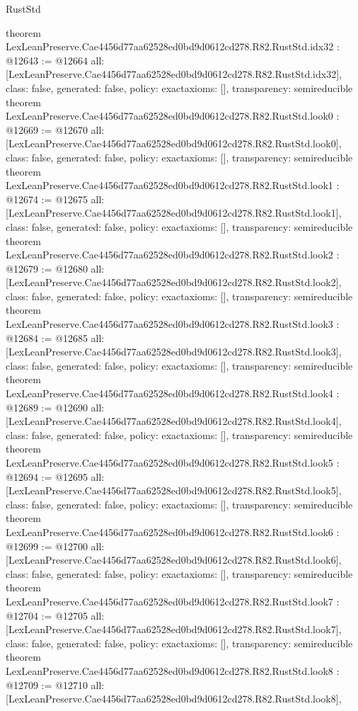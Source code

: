 \begin{lexlean}{RustStd}
\begin{coremodule}
{}
theorem LexLeanPreserve.Cae4456d77aa62528ed0bd9d0612cd278.R82.RustStd.idx32 : @12643 := @12664 {
  all: [LexLeanPreserve.Cae4456d77aa62528ed0bd9d0612cd278.R82.RustStd.idx32],
  class: false,
  generated: false,
  policy: exact{axioms: []},
  transparency: semireducible
}
theorem LexLeanPreserve.Cae4456d77aa62528ed0bd9d0612cd278.R82.RustStd.look0 : @12669 := @12670 {
  all: [LexLeanPreserve.Cae4456d77aa62528ed0bd9d0612cd278.R82.RustStd.look0],
  class: false,
  generated: false,
  policy: exact{axioms: []},
  transparency: semireducible
}
theorem LexLeanPreserve.Cae4456d77aa62528ed0bd9d0612cd278.R82.RustStd.look1 : @12674 := @12675 {
  all: [LexLeanPreserve.Cae4456d77aa62528ed0bd9d0612cd278.R82.RustStd.look1],
  class: false,
  generated: false,
  policy: exact{axioms: []},
  transparency: semireducible
}
theorem LexLeanPreserve.Cae4456d77aa62528ed0bd9d0612cd278.R82.RustStd.look2 : @12679 := @12680 {
  all: [LexLeanPreserve.Cae4456d77aa62528ed0bd9d0612cd278.R82.RustStd.look2],
  class: false,
  generated: false,
  policy: exact{axioms: []},
  transparency: semireducible
}
theorem LexLeanPreserve.Cae4456d77aa62528ed0bd9d0612cd278.R82.RustStd.look3 : @12684 := @12685 {
  all: [LexLeanPreserve.Cae4456d77aa62528ed0bd9d0612cd278.R82.RustStd.look3],
  class: false,
  generated: false,
  policy: exact{axioms: []},
  transparency: semireducible
}
theorem LexLeanPreserve.Cae4456d77aa62528ed0bd9d0612cd278.R82.RustStd.look4 : @12689 := @12690 {
  all: [LexLeanPreserve.Cae4456d77aa62528ed0bd9d0612cd278.R82.RustStd.look4],
  class: false,
  generated: false,
  policy: exact{axioms: []},
  transparency: semireducible
}
theorem LexLeanPreserve.Cae4456d77aa62528ed0bd9d0612cd278.R82.RustStd.look5 : @12694 := @12695 {
  all: [LexLeanPreserve.Cae4456d77aa62528ed0bd9d0612cd278.R82.RustStd.look5],
  class: false,
  generated: false,
  policy: exact{axioms: []},
  transparency: semireducible
}
theorem LexLeanPreserve.Cae4456d77aa62528ed0bd9d0612cd278.R82.RustStd.look6 : @12699 := @12700 {
  all: [LexLeanPreserve.Cae4456d77aa62528ed0bd9d0612cd278.R82.RustStd.look6],
  class: false,
  generated: false,
  policy: exact{axioms: []},
  transparency: semireducible
}
theorem LexLeanPreserve.Cae4456d77aa62528ed0bd9d0612cd278.R82.RustStd.look7 : @12704 := @12705 {
  all: [LexLeanPreserve.Cae4456d77aa62528ed0bd9d0612cd278.R82.RustStd.look7],
  class: false,
  generated: false,
  policy: exact{axioms: []},
  transparency: semireducible
}
theorem LexLeanPreserve.Cae4456d77aa62528ed0bd9d0612cd278.R82.RustStd.look8 : @12709 := @12710 {
  all: [LexLeanPreserve.Cae4456d77aa62528ed0bd9d0612cd278.R82.RustStd.look8],
}
\end{coremodule}
\end{lexlean}
